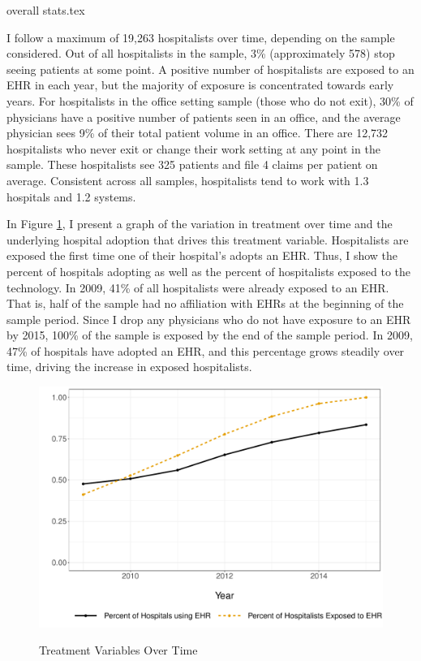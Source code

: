 \documentclass[12pt]{article}
\begin{document}
{overall stats.tex}

\normalsize
I follow a maximum of 19,263 hospitalists over time, depending on the sample considered. Out of all hospitalists in the sample, 3\% (approximately 578) stop seeing patients at some point. A positive number of hospitalists are exposed to an EHR in each year, but the majority of exposure is concentrated towards early years. For hospitalists in the office setting sample (those who do not exit), 30\% of physicians have a positive number of patients seen in an office, and the average physician sees 9\% of their total patient volume in an office. There are 12,732 hospitalists who never exit or change their work setting at any point in the sample. These hospitalists see 325 patients and file 4 claims per patient on average. Consistent across all samples, hospitalists tend to work with 1.3 hospitals and 1.2 systems. 


In Figure \ref{fig:treatmentgraph}, I present a graph of the variation in treatment over time and the underlying hospital adoption that drives this treatment variable. Hospitalists are exposed the first time one of their hospital's adopts an EHR. Thus, I show the percent of hospitals adopting as well as the percent of hospitalists exposed to the technology. In 2009, 41\% of all hospitalists were already exposed to an EHR. That is, half of the sample had no affiliation with EHRs at the beginning of the sample period. Since I drop any physicians who do not have exposure to an EHR by 2015, 100\% of the sample is exposed by the end of the sample period. In 2009, 47\% of hospitals have adopted an EHR, and this percentage grows steadily over time, driving the increase in exposed hospitalists. 

\begin{figure}[t]
\centering
\captionsetup{width=.45\linewidth}
    \caption{Treatment Variables Over Time}
    \includegraphics[scale=.6]{Objects/sum_stats_year.pdf}
    \label{fig:treatmentgraph}
\end{figure}
\end{document}
